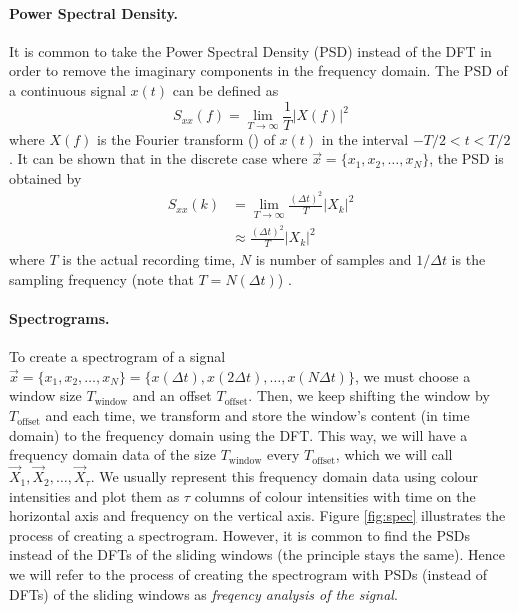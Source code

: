\paragraph{Power Spectral Density.}
	It is common to take the Power Spectral Density (PSD) instead of the DFT in order to remove the imaginary components in the frequency domain. The PSD of a continuous signal $x(t)$ can be defined as
	\begin{equation}
		S_{xx}(f) = \lim_{T \to \infty} \frac{1}{T} \left| X(f) \right|^2
	\end{equation}
	where $X(f)$ is the Fourier transform () of $x(t)$ in the interval $-T / 2 < t < T / 2$ \cite{hlt}. It can be shown that in the discrete case where $\vec x = \{x_1, x_2, \dotsc, x_{N}\}$, the PSD is obtained by
	\begin{align}
		S_{xx}(k) 	&= \lim_{T \to \infty} \frac{(\Delta t)^2}{T} |X_k|^2\\
					&\approx \frac{(\Delta t)^2}{T} |X_k|^2
	\end{align}
	where $T$ is the actual recording time, $N$ is number of samples and $1/\Delta t$ is the sampling frequency (note that $T = N(\Delta t)$) \cite{wiki:PSD}.

\paragraph{Spectrograms.}
	To create a spectrogram of a signal $\vec x = \{x_1, x_2, \dotsc, x_N\} = \{x(\Delta t), x(2\Delta t), \dotsc, x(N\Delta t)\}$, we must choose a window size $T_\text{window}$ and an offset $T_\text{offset}$. Then, we keep shifting the window by $T_\text{offset}$ and each time, we transform and store the window's content (in time domain) to the frequency domain using the DFT. This way, we will have a frequency domain data of the size $T_\text{window}$ every $T_\text{offset}$, which we will call $\vec X_1, \vec X_2, \dotsc, \vec X_\tau$. We usually represent this frequency domain data using colour intensities and plot them as $\tau$ columns of colour intensities with time on the horizontal axis and frequency on the vertical axis. Figure \ref{fig:spec} illustrates the process of creating a spectrogram. However, it is common to find the PSDs instead of the DFTs of the sliding windows (the principle stays the same). Hence we will refer to the process of creating the spectrogram with PSDs (instead of DFTs) of the sliding windows as \emph{freqency analysis of the signal}.

